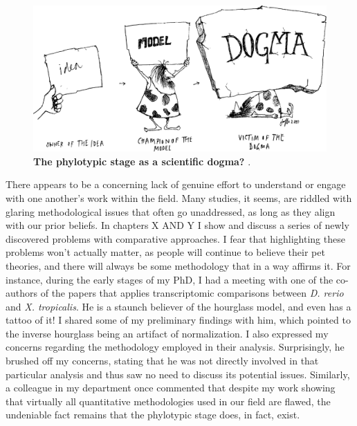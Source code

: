 \begin{figure}
    \includegraphics[width=\linewidth]{ch.discussion/imgs/dogma.png}
    \caption{\textbf{The phylotypic stage as a scientific dogma?} \cite{Caveman2000}.}
    \label{fig:dogma}
\end{figure}

There appears to be a concerning lack of genuine effort to understand or engage with one another's work within the field. Many studies, it seems, are riddled with glaring methodological issues that often go unaddressed, as long as they align with our prior beliefs. In chapters X AND Y I show and discuss a series of newly discovered problems with comparative approaches. I fear that highlighting these problems won't actually matter, as people will continue to believe their pet theories, and there will always be some methodology that in a way affirms it. For instance, during the early stages of my PhD, I had a meeting with one of the co-authors of the papers that applies transcriptomic comparisons between \textit{D. rerio} and \textit{X. tropicalis}\cite{marletaz2018}. He is a staunch believer of the hourglass model, and even has a tattoo of it! I shared some of my preliminary findings with him, which pointed to the inverse hourglass being an artifact of normalization. I also expressed my concerns regarding the methodology employed in their analysis. Surprisingly, he brushed off my concerns, stating that he was not directly involved in that particular analysis and thus saw no need to discuss its potential issues. Similarly, a colleague in my department once commented that despite my work showing that virtually all quantitative methodologies used in our field are flawed, the undeniable fact remains that the phylotypic stage does, in fact, exist.

